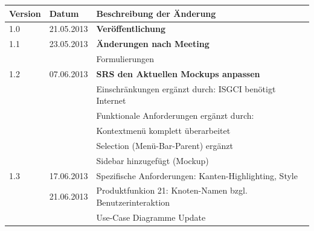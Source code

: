 \documentclass[10pt,a4paper]{article}
\begin{document}
\hspace*{-1cm}
\begin{tabular}{|l|l|p{10.5cm}|}\hline
 \textbf{Version}&\textbf{Datum}&\textbf{Beschreibung der \"Anderung}\\\hline
 1.0&21.05.2013&\textbf{Veröffentlichung}\\\hline
 1.1&23.05.2013& \textbf{Änderungen nach Meeting} \\\hline
   & & Formulierungen \\\hline
 1.2& 07.06.2013 & \textbf{SRS den Aktuellen Mockups anpassen} \\\hline
 &  &  Einschränkungen ergänzt durch: ISGCI benötigt Internet  \\\hline
  &  &  Funktionale Anforderungen ergänzt durch:  \\\hline
   &  &  Kontextmenü komplett überarbeitet \\\hline 
    &  &  Selection (Menü-Bar-Parent) ergänzt \\\hline
     &  &  Sidebar hinzugefügt (Mockup) \\\hline
 1.3& 17.06.2013 & Spezifische Anforderungen: Kanten-Highlighting, Style  \\\hline
 & 21.06.2013 & Produktfunkion 21: Knoten-Namen bzgl. Benutzerinteraktion \\\hline
 &  & Use-Case Diagramme Update \\\hline
 
 
\end{tabular}\\

 \newpage
 
 
 
 

%
%
%
\end{document}
